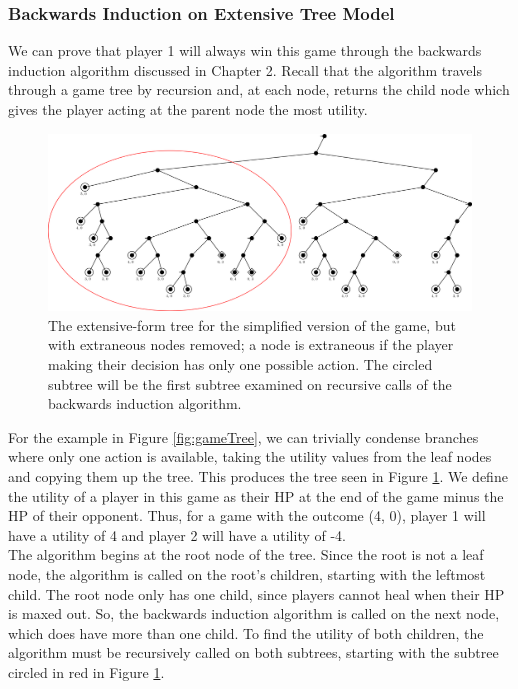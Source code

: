 \subsubsection{Backwards Induction on Extensive Tree Model}
We can prove that player 1 will always win this game through the backwards induction algorithm discussed in Chapter 2. Recall that the algorithm travels through a game tree by recursion and, at each node, returns the child node which gives the player acting at the parent node the most utility.

\begin{figure}[H]
  \centering
  \includegraphics[width=15cm]{figures/Backwards0.png}
  \caption{The extensive-form tree for the simplified version of the game, but with extraneous nodes removed; a node is extraneous if the player making their decision has only one possible action. The circled subtree will be the first subtree examined on recursive calls of the backwards induction algorithm.}
  \label{fig:condensedTree}
\end{figure}

For the example in Figure \ref{fig:gameTree}, we can trivially condense branches where only one action is available, taking the utility values from the leaf nodes and copying them up the tree. This produces the tree seen in Figure \ref{fig:condensedTree}. We define the utility of a player in this game as their HP at the end of the game minus the HP of their opponent. Thus, for a game with the outcome (4, 0), player 1 will have a utility of 4 and player 2 will have a utility of -4.\\

The algorithm begins at the root node of the tree. Since the root is not a leaf node, the algorithm is called on the root's children, starting with the leftmost child. The root node only has one child, since players cannot heal when their HP is maxed out. So, the backwards induction algorithm is called on the next node, which does have more than one child. To find the utility of both children, the algorithm must be recursively called on both subtrees, starting with the subtree circled in red in Figure \ref{fig:condensedTree}.\\

